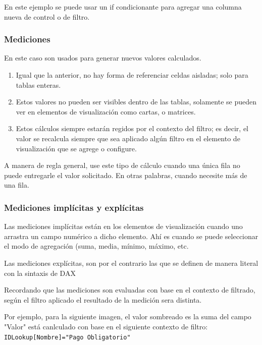 En este ejemplo se puede usar un if condicionante para agregar una columna nueva de control o de filtro.


\subsubsection{Mediciones}

En este caso son usados para generar nuevos valores calculados.

\begin{enumerate}
    \item Igual que la anterior, no hay forma de referenciar celdas aisladas; solo para tablas enteras.
    \item Estos valores no pueden ser visibles dentro de las tablas, solamente se pueden ver en elementos de visualización como cartas, o matrices.
    \item Estos cálculos siempre estarán regidos por el contexto del filtro; es decir, el valor se recalcula siempre que sea aplicado algún filtro en el elemento de visualización que se agrege o configure.
\end{enumerate}

A manera de regla general, use este tipo de cálculo cuando una única fila no puede entregarle el valor solicitado. En otras palabras, cuando necesite más de una fila.

\subsubsection{Mediciones implícitas y explícitas}

Las mediciones implícitas están en los elementos de visualización cuando uno arrastra un campo numérico a dicho elemento. Ahí es cuando se puede seleccionar el modo de agregación (suma, media, mínimo, máximo, etc.

Las mediciones explícitas, son por el contrario las que se definen de manera literal con la sintaxis de DAX

Recordando que las mediciones son evaluadas con base en el contexto de filtrado, según el filtro aplicado el resultado de la medición sera distinta. 

Por ejemplo, para la siguiente imagen, el valor sombreado es la suma del campo "Valor" está canlculado con base en el siguiente contexto de filtro: \texttt{IDLookup[Nombre]="Pago Obligatorio"}

